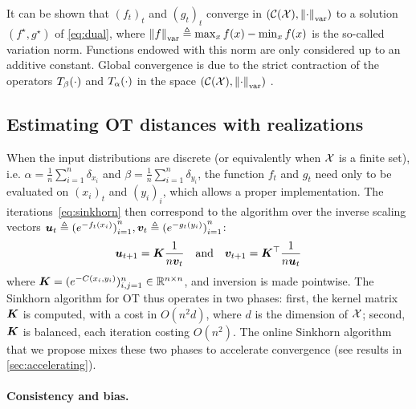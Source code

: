 It can be shown that ${(f_t)}_t$ and ${(g_t)}_t$ converge in $(\mathcal{C}(\mathcal{X}),
\left\| \cdot \right\|_{\text{var}})$ to a solution $(f^\star, g^\star)$ of
\eqref{eq:dual}, where $\left\| f \right\|_{\text{var}} \triangleq \max_x f(x) - \min_x f(x)$
is the so-called variation norm. Functions endowed with this norm are only
considered up to an additive constant.  Global convergence is due to the strict
contraction of the operators $T_{\beta}(\cdot)$ and
$T_{\alpha}(\cdot)$ in the space $(\mathcal{C}(\mathcal{X}), \left\| \cdot \right\|_{\text{var}})$
\citep{lemmens_nonlinear_2012}.

\subsection{Estimating OT distances with realizations}

When the input distributions are discrete (or equivalently when $\mathcal{X}$ is a
finite set), i.e. $\alpha = \frac{1}{n}\sum_{i=1}^n \delta_{x_i}$ and $\beta =
\frac{1}{n} \sum_{i=1}^n \delta_{y_i}$, the function $f_t$ and $g_t$ need only
to be evaluated on $(x_i)_t$ and $(y_i)_i$, which allows a proper implementation. The
iterations~\eqref{eq:sinkhorn} then correspond to the
\citet{sinkhorn1967concerning} algorithm over the inverse scaling vectors $\bm{u}_t
\triangleq {(e^{-f_t(x_i)})}_{i=1}^n, \bm{v}_t \triangleq
{(e^{-g_t(y_i)})}_{i=1}^n$:
\begin{equation*}
	\bm{u}_{t+1} = \bm{K} \frac{1}{n \bm{v}_t}
	\quad \text{and} \quad
	\bm{v}_{t+1} = \bm{K}^\top \frac{1}{n \bm{u}_t}
\end{equation*}
where $\bm{K}=(e^{-C(x_i,y_i)})_{i,j=1}^n \in \mathbb{R}^{n \times n}$, and inversion is made pointwise. The Sinkhorn algorithm for OT thus
operates in two phases: first, the kernel matrix $\bm{K}$ is computed, with a cost in
$O(n^2 d)$, where $d$ is the dimension of $\mathcal{X}$; second, $\bm{K}$ is balanced, each
iteration costing $O(n^2)$. The online Sinkhorn algorithm that we propose mixes
these two phases to accelerate convergence (see results in \autoref{sec:accelerating}).


\paragraph{Consistency and bias.}\label{sec:gradient}


